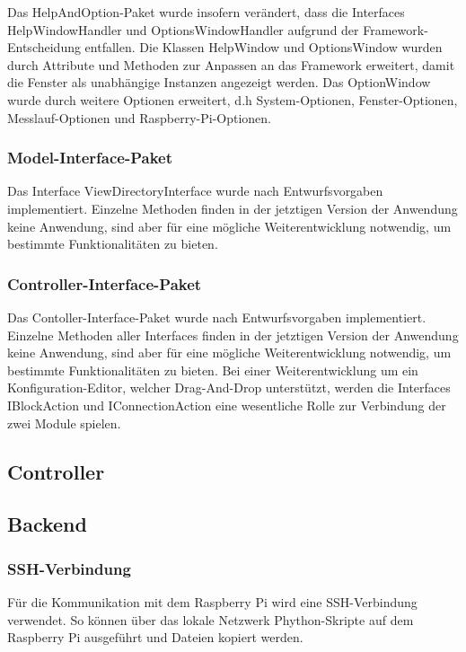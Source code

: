 \documentclass[parskip=full]{scrartcl}
\begin{document}
Das HelpAndOption-Paket wurde insofern verändert, dass die Interfaces HelpWindowHandler und OptionsWindowHandler aufgrund der Framework-Entscheidung entfallen.
Die Klassen HelpWindow und OptionsWindow wurden durch Attribute und Methoden zur Anpassen an das Framework erweitert, damit die Fenster als unabhängige Instanzen angezeigt werden. Das OptionWindow wurde durch weitere Optionen erweitert, d.h System-Optionen, Fenster-Optionen, Messlauf-Optionen und Raspberry-Pi-Optionen.

\subsubsection{Model-Interface-Paket}

Das Interface ViewDirectoryInterface wurde nach Entwurfsvorgaben implementiert. Einzelne Methoden finden in der jetztigen Version der Anwendung keine Anwendung, sind aber für eine mögliche Weiterentwicklung notwendig, um bestimmte Funktionalitäten zu bieten.

\subsubsection{Controller-Interface-Paket}

Das Contoller-Interface-Paket wurde nach Entwurfsvorgaben implementiert. Einzelne Methoden aller Interfaces finden in der jetztigen Version der Anwendung keine Anwendung, sind aber für eine mögliche Weiterentwicklung notwendig, um bestimmte Funktionalitäten zu bieten. Bei einer Weiterentwicklung um ein Konfiguration-Editor, welcher Drag-And-Drop unterstützt, werden die Interfaces IBlockAction und IConnectionAction eine wesentliche Rolle zur Verbindung der zwei Module spielen.

\subsection{Controller}

\subsection{Backend}

\subsubsection{SSH-Verbindung}

Für die Kommunikation mit dem Raspberry Pi wird eine SSH-Verbindung verwendet. So können über das lokale Netzwerk Phython-Skripte auf dem Raspberry Pi ausgeführt und Dateien kopiert werden.
\end{document}
